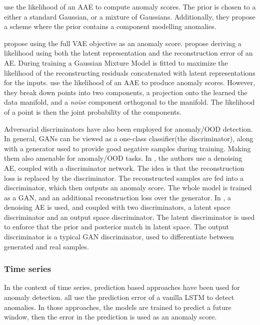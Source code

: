 \documentclass[../main.tex]{subfiles}
\begin{document}
\citet{leveau2017adversarial} use the likelihood of an AAE to compute anomaly scores. The prior is chosen to a either a standard Gaussian, or a mixture of Gaussians. Additionally, they propose a scheme where the prior contains a component modelling anomalies. 

\cite{vasilev2018q} propose using the full VAE objective as an anomaly score. \citet{zong2018deep} propose deriving a likelihood using both the latent representation and the reconstruction error of an AE. During training a Gaussian Mixture Model is fitted to maximize the likelihood of the reconstructing residuals concatenated with latent representations for the inputs. 
\citet{pidhorskyi2018generative} use the likelihood of an AAE to produce anomaly scores. However, they break down points into two components, a projection onto the learned the data manifold, and a \emph{noise} component orthogonal to the manifold. The likelihood of a point is then the joint probability of the components. 

Adversarial discriminators have also been employed for anomaly/OOD detection. In general, GANs can be viewed as a one-class classifier(the discriminator), along with a generator used to provide good negative samples during training. Making them also amenable for anomaly/OOD tasks.
In \citep{sabokrou2018adversarially}, the authors use a denoising AE, coupled with a discriminator network. The idea is that the reconstruction loss is replaced by the discriminator. The reconstructed samples are fed into a discriminator, which then outputs an anomaly score. The whole model is trained as a GAN, and an additional reconstruction loss over the generator. In \citep{perera2019ocgan}, a denoising AE is used, and coupled with two discriminators, a latent space discriminator and an output space discriminator. The latent discriminator is used to enforce that the prior and posterior match in latent space. The output discriminator is a typical GAN discriminator, used to differentiate between generated and real samples.  

\subsubsection{Time series}

In the context of time series, prediction based approaches have been used for anomaly detection. \citep{hundman2018detecting, taylor2016anomaly, malhotra2015long, marchi2015non} all use the prediction error of a vanilla LSTM to detect anomalies. 
In those approaches, the models are trained to predict a future window, then the error in the prediction is used as an anomaly score. 
\end{document}

